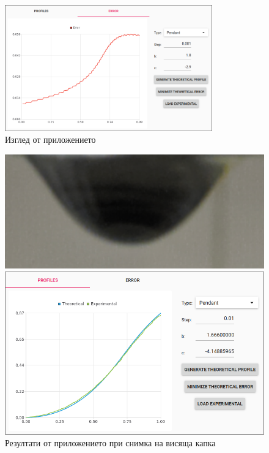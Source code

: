 \documentclass{article}
\begin{document}
\begin{figure}[H]
\centering
\includegraphics[width=0.8\textwidth]{app-2.png}
\caption{Изглед от приложението}
\end{figure}

\begin{figure}[H]
\centering
\begin{minipage}{0.5\textwidth}
  \centering
  \includegraphics[width=0.9\linewidth]{pendant_real_deal_2.png}
\end{minipage}%
\begin{minipage}{0.5\textwidth}
  \centering
  \includegraphics[width=0.9\linewidth]{app_real_deal_2.png}
\end{minipage}
\caption{Резултати от приложението при снимка на висяща капка}
\end{figure}
\end{document}
